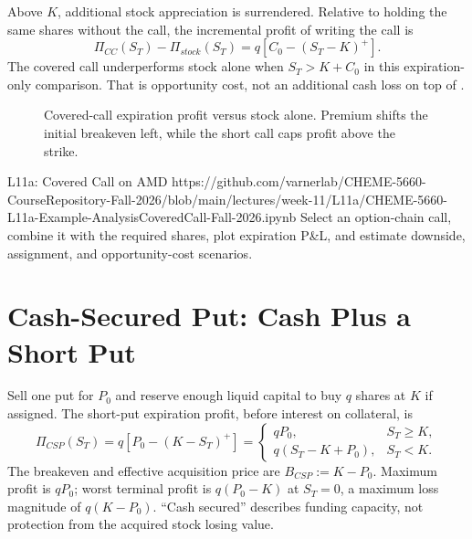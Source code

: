 \documentclass[11pt]{article}
\begin{document}
Above $K$, additional stock appreciation is surrendered. Relative to holding the same shares without the call, the incremental profit of writing the call is
\begin{equation}
  \label{eq:covered-call-relative}
  \Pi_{CC}(S_T)-\Pi_{stock}(S_T)
  =q\left[C_0-(S_T-K)^+\right].
\end{equation}
The covered call underperforms stock alone when $S_T>K+C_0$ in this expiration-only comparison. That is opportunity cost, not an additional cash loss on top of .

\begin{figure}[ht]
  \centering
  \caption{Covered-call expiration profit versus stock alone. Premium shifts the initial breakeven left, while the short call caps profit above the strike.}
  \label{fig:covered-call}
\end{figure}

\notebooklink
  {L11a: Covered Call on AMD}
  {https://github.com/varnerlab/CHEME-5660-CourseRepository-Fall-2026/blob/main/lectures/week-11/L11a/CHEME-5660-L11a-Example-AnalysisCoveredCall-Fall-2026.ipynb}
  {Select an option-chain call, combine it with the required shares, plot expiration P\&L, and estimate downside, assignment, and opportunity-cost scenarios.}

\section{Cash-Secured Put: Cash Plus a Short Put}

Sell one put for $P_0$ and reserve enough liquid capital to buy $q$ shares at $K$ if assigned. The short-put expiration profit, before interest on collateral, is
\begin{equation}
  \label{eq:csp-profit}
  \Pi_{CSP}(S_T)
  =q\left[P_0-(K-S_T)^+\right]
  =
  \begin{cases}
    qP_0, & S_T\geq K,\\
    q(S_T-K+P_0), & S_T<K.
  \end{cases}
\end{equation}
The breakeven and effective acquisition price are $B_{CSP}:=K-P_0$. Maximum profit is $qP_0$; worst terminal profit is $q(P_0-K)$ at $S_T=0$, a maximum loss magnitude of $q(K-P_0)$. ``Cash secured'' describes funding capacity, not protection from the acquired stock losing value.
\end{document}
